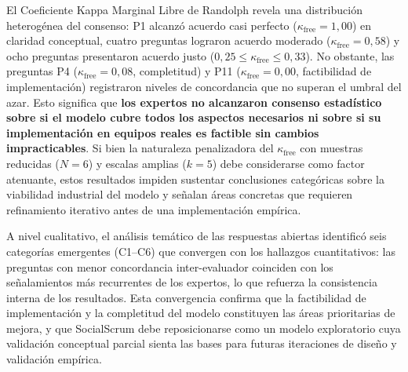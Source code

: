 El Coeficiente Kappa Marginal Libre de Randolph \cite{randolph2005} revela una distribución heterogénea del consenso: P1 alcanzó acuerdo casi perfecto ($\kappa_{\text{free}} = 1{,}00$) en claridad conceptual, cuatro preguntas lograron acuerdo moderado ($\kappa_{\text{free}} = 0{,}58$) y ocho preguntas presentaron acuerdo justo ($0{,}25 \leq \kappa_{\text{free}} \leq 0{,}33$). No obstante, las preguntas P4 ($\kappa_{\text{free}} = 0{,}08$, completitud) y P11 ($\kappa_{\text{free}} = 0{,}00$, factibilidad de implementación) registraron niveles de concordancia que no superan el umbral del azar. Esto significa que \textbf{los expertos no alcanzaron consenso estadístico sobre si el modelo cubre todos los aspectos necesarios ni sobre si su implementación en equipos reales es factible sin cambios impracticables}. Si bien la naturaleza penalizadora del $\kappa_{\text{free}}$ con muestras reducidas ($N = 6$) y escalas amplias ($k = 5$) debe considerarse como factor atenuante, estos resultados impiden sustentar conclusiones categóricas sobre la viabilidad industrial del modelo y señalan áreas concretas que requieren refinamiento iterativo antes de una implementación empírica.

A nivel cualitativo, el análisis temático de las respuestas abiertas identificó seis categorías emergentes (C1--C6) que convergen con los hallazgos cuantitativos: las preguntas con menor concordancia inter-evaluador coinciden con los señalamientos más recurrentes de los expertos, lo que refuerza la consistencia interna de los resultados. Esta convergencia confirma que la factibilidad de implementación y la completitud del modelo constituyen las áreas prioritarias de mejora, y que SocialScrum debe reposicionarse como un modelo exploratorio cuya validación conceptual parcial sienta las bases para futuras iteraciones de diseño y validación empírica.